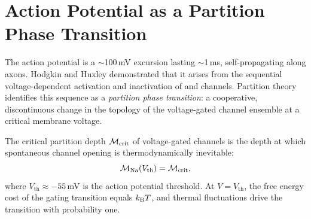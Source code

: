 \section{Action Potential as a Partition Phase Transition}
\label{sec:action_potential}

The action potential is a $\sim$100\,mV excursion lasting $\sim$1\,ms,
self-propagating along axons. Hodgkin and Huxley \citeyearpar{Hodgkin1952b}
demonstrated that it arises from the sequential voltage-dependent activation
and inactivation of  and  channels. Partition theory identifies
this sequence as a \emph{partition phase transition}: a cooperative, discontinuous
change in the topology of the voltage-gated channel ensemble at a critical
membrane voltage.

\begin{definition}
\label{def:critical_depth}
The critical partition depth $\mathcal{M}_{\mathrm{crit}}$ of voltage-gated
 channels is the depth at which spontaneous channel opening is
thermodynamically inevitable:
\begin{equation}
  \mathcal{M}_{\mathrm{Na}}(V_{\mathrm{th}}) = \mathcal{M}_{\mathrm{crit}},
  \label{eq:critical_depth_def}
\end{equation}
where $V_{\mathrm{th}} \approx -55$\,mV is the action potential threshold.
At $V = V_{\mathrm{th}}$, the free energy cost of the gating transition equals
$k_{\mathrm{B}} T$, and thermal fluctuations drive the transition with probability one.
\end{definition}

